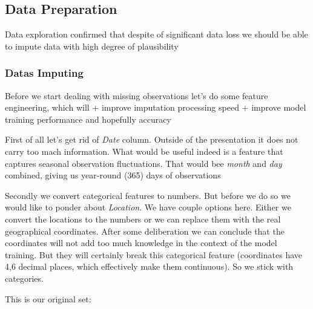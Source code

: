 \hypertarget{data-preparation}{%
\subsection{Data Preparation}\label{data-preparation}}

Data exploration confirmed that despite of significant data loss we
should be able to impute data with high degree of plausibility

\hypertarget{datas-imputing}{%
\subsubsection{Datas Imputing}\label{datas-imputing}}

Before we start dealing with missing observations let's do some feature
engineering, which will + improve imputation processing speed + improve
model training performance and hopefully accuracy

First of all let's get rid of \emph{Date} column. Outside of the
presentation it does not carry too mach information. What would be
useful indeed is a feature that captures seasonal observation
fluctuations. That would bee \emph{month} and \emph{day} combined,
giving us year-round (365) days of observations

Secondly we convert categorical features to numbers. But before we do so
we would like to ponder about \emph{Location}. We have couple options
here. Either we convert the locations to the numbers or we can replace
them with the real geographical coordinates. After some deliberation we
can conclude that the coordinates will not add too much knowledge in the
context of the model training. But they will certainly break this
categorical feature (coordinates have 4,6 decimal places, which
effectively make them continuous). So we stick with categories.

This is our original set:

